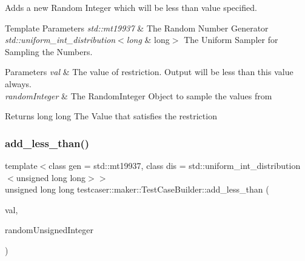 Adds a new Random Integer which will be less than value specified. 


\begin{DoxyTemplParams}{Template Parameters}
{\em std\+::mt19937} & The Random Number Generator \\
\hline
{\em std\+::uniform\+\_\+int\+\_\+distribution$<$long} & long$>$ The Uniform Sampler for Sampling the Numbers. \\
\hline
\end{DoxyTemplParams}

\begin{DoxyParams}{Parameters}
{\em val} & The value of restriction. Output will be less than this value always. \\
\hline
{\em random\+Integer} & The Random\+Integer Object to sample the values from \\
\hline
\end{DoxyParams}
\begin{DoxyReturn}{Returns}
long long The Value that satisfies the restriction 
\end{DoxyReturn}
\mbox{\label{classtestcaser_1_1maker_1_1TestCaseBuilder_abc8a125ff2b991fc530a8263ba10ff3f}} 
\subsubsection{\texorpdfstring{add\_less\_than()}{add\_less\_than()}\hspace{0.1cm}{\footnotesize\ttfamily [2/2]}}
{\footnotesize\ttfamily template$<$class gen  = std\+::mt19937, class dis  = std\+::uniform\+\_\+int\+\_\+distribution$<$unsigned long long$>$$>$ \\
unsigned long long testcaser\+::maker\+::\+Test\+Case\+Builder\+::add\+\_\+less\+\_\+than (\begin{DoxyParamCaption}\item[{unsigned long long}]{val,  }\item[{\mbox{\hyperlink{classtestcaser_1_1maker_1_1types_1_1RandomUnsignedInteger}{types\+::\+Random\+Unsigned\+Integer}}$<$ gen, dis $>$ \&}]{random\+Unsigned\+Integer }\end{DoxyParamCaption})\hspace{0.3cm}{\ttfamily [inline]}}




